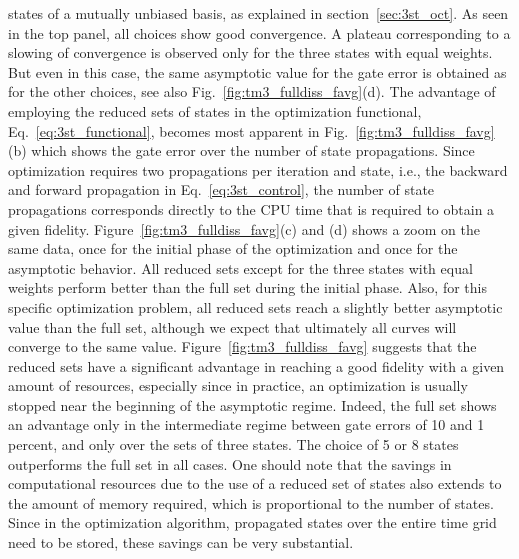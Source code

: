 states of a mutually unbiased basis, as explained in
section~\ref{sec:3st_oct}.
As seen in the top panel, all choices %
show good convergence. A plateau corresponding to a slowing of
convergence is observed only for the three
states with equal weights. But even in this case, the same asymptotic
value for the gate error is obtained as for the other choices, see also
Fig.~\ref{fig:tm3_fulldiss_favg}(d).
The advantage of employing the reduced sets of
states in the optimization functional, Eq.~\eqref{eq:3st_functional},
becomes most apparent in Fig.~\ref{fig:tm3_fulldiss_favg}(b)
which shows the gate error over the number of state
propagations. Since optimization requires two propagations per
iteration and state, i.e., the
backward and forward propagation in Eq.~\eqref{eq:3st_control}, the number
of state propagations corresponds directly to the CPU time that is
required to obtain a given
fidelity. Figure~\ref{fig:tm3_fulldiss_favg}(c) and (d)
shows a zoom on the same data, once for the initial phase
of the optimization and once for the asymptotic behavior. All reduced sets
except for the three states with equal weights perform better than the
full set during the
initial phase.  Also, for this specific optimization problem, all reduced sets
reach a slightly better asymptotic value than the full set, although we
expect that ultimately all curves will converge to the same value.
Figure~\ref{fig:tm3_fulldiss_favg} suggests that
the reduced sets have a significant
advantage in reaching a good fidelity with a given amount of resources, especially
since in practice, an optimization is usually stopped near the beginning of the
asymptotic regime. Indeed, the full set shows an advantage only in the
intermediate regime between gate errors of 10 and 1 percent, and only over the
sets of three states. The choice of 5 or 8 states outperforms the full set in
all cases.
One should note that the savings in computational resources due to the
use of a reduced set of
states also extends to the amount of memory required, which is proportional to
the number of states. Since in the optimization algorithm, propagated states
over the entire time grid need to be stored, these savings can be very
substantial.

